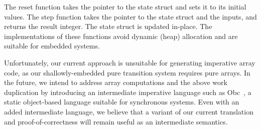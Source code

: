 The reset function takes the pointer to the state struct and sets it to its initial values.
The step function takes the pointer to the state struct and the inputs, and returns the result integer.
The state struct is updated in-place.
The implementations of these functions avoid dynamic (heap) allocation and are suitable for embedded systems.


Unfortunately, our current approach is unsuitable for generating imperative array code, as our shallowly-embedded pure transition system requires pure arrays.
In the future, we intend to address array computations and the above work duplication by introducing an intermediate imperative language such as Obc~\cite{biernacki2008clock}, a static object-based language suitable for synchronous systems.
Even with an added intermediate language, we believe that a variant of our current translation and proof-of-correctness will remain useful as an intermediate semantics.
